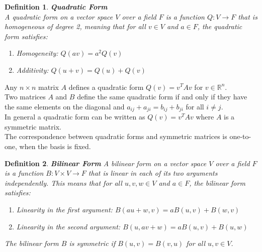 \documentclass[11pt]{book} %
\newtheorem{definition}{Definition}[section]
\begin{document}
\begin{definition}{\textbf{Quadratic Form}} \\
    A quadratic form on a vector space \( V \) over a field \( F \) is a function \( Q: V \to F \) that is homogeneous of degree 2, 
    meaning that for all \( v \in V \) and \( a \in F \), the quadratic form satisfies:
    \begin{enumerate}
        \item Homogeneity: \( Q(av) = a^2 Q(v) \)
        \item Additivity: \( Q(u + v) = Q(u) + Q(v) \)
    \end{enumerate}
\end{definition}

Any $n \times n$ matrix $A$ defines a quadratic form $Q(v) = v^T A v$ for $v \in \mathbb{R}^n$.  \\
Two matrices $A$ and $B$ define the same quadratic form if and only if they have the same elements on the diagonal and $a_{ij} + a_{ji} = b_{ij} + b_{ji}$ for all $i \neq j$. \\
In general a quadratic form can be written as $Q(v) = v^T A v$ where $A$ is a symmetric matrix. \\
The correspondence between quadratic forms and symmetric matrices is one-to-one, when the basis is fixed.

\begin{definition}{\textbf{Bilinear Form}}
    A bilinear form on a vector space \( V \) over a field \( F \) is a function \( B: V \times V \to F \) that is linear in each of its two arguments independently. This means that for all \( u, v, w \in V \) and \( a \in F \), the bilinear form satisfies:
    \begin{enumerate}
        \item Linearity in the first argument: \( B(au + w, v) = a B(u, v) + B(w, v) \)
        \item Linearity in the second argument: \( B(u, av + w) = a B(u, v) + B(u, w) \)
    \end{enumerate}
    The bilinear form \( B \) is symmetric if \( B(u, v) = B(v, u) \) for all \( u, v \in V \).
\end{definition}
\end{document}
